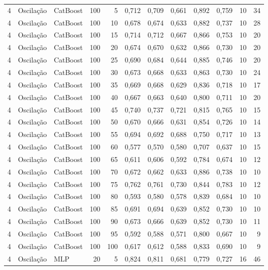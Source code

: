 \begin{longtable}{@{}rllrrrrrrrrr@{}}
4 & Oscilação & CatBoost & 100 & 5 & 0,712 & 0,709 & 0,661 & 0,892 & 0,759 & 10 & 34 \\
4 & Oscilação & CatBoost & 100 & 10 & 0,678 & 0,674 & 0,633 & 0,882 & 0,737 & 10 & 28 \\
4 & Oscilação & CatBoost & 100 & 15 & 0,714 & 0,712 & 0,667 & 0,866 & 0,753 & 10 & 20 \\
4 & Oscilação & CatBoost & 100 & 20 & 0,674 & 0,670 & 0,632 & 0,866 & 0,730 & 10 & 20 \\
4 & Oscilação & CatBoost & 100 & 25 & 0,690 & 0,684 & 0,644 & 0,885 & 0,746 & 10 & 20 \\
4 & Oscilação & CatBoost & 100 & 30 & 0,673 & 0,668 & 0,633 & 0,863 & 0,730 & 10 & 24 \\
4 & Oscilação & CatBoost & 100 & 35 & 0,669 & 0,668 & 0,629 & 0,836 & 0,718 & 10 & 17 \\
4 & Oscilação & CatBoost & 100 & 40 & 0,667 & 0,663 & 0,640 & 0,800 & 0,711 & 10 & 20 \\
4 & Oscilação & CatBoost & 100 & 45 & 0,740 & 0,737 & 0,721 & 0,815 & 0,765 & 10 & 15 \\
4 & Oscilação & CatBoost & 100 & 50 & 0,670 & 0,666 & 0,631 & 0,854 & 0,726 & 10 & 14 \\
4 & Oscilação & CatBoost & 100 & 55 & 0,694 & 0,692 & 0,688 & 0,750 & 0,717 & 10 & 13 \\
4 & Oscilação & CatBoost & 100 & 60 & 0,577 & 0,570 & 0,580 & 0,707 & 0,637 & 10 & 15 \\
4 & Oscilação & CatBoost & 100 & 65 & 0,611 & 0,606 & 0,592 & 0,784 & 0,674 & 10 & 12 \\
4 & Oscilação & CatBoost & 100 & 70 & 0,672 & 0,662 & 0,633 & 0,886 & 0,738 & 10 & 10 \\
4 & Oscilação & CatBoost & 100 & 75 & 0,762 & 0,761 & 0,730 & 0,844 & 0,783 & 10 & 12 \\
4 & Oscilação & CatBoost & 100 & 80 & 0,593 & 0,580 & 0,578 & 0,839 & 0,684 & 10 & 10 \\
4 & Oscilação & CatBoost & 100 & 85 & 0,691 & 0,694 & 0,639 & 0,852 & 0,730 & 10 & 10 \\
4 & Oscilação & CatBoost & 100 & 90 & 0,673 & 0,666 & 0,639 & 0,852 & 0,730 & 10 & 11 \\
4 & Oscilação & CatBoost & 100 & 95 & 0,592 & 0,588 & 0,571 & 0,800 & 0,667 & 10 & 9 \\
4 & Oscilação & CatBoost & 100 & 100 & 0,617 & 0,612 & 0,588 & 0,833 & 0,690 & 10 & 9 \\
4 & Oscilação & MLP & 20 & 5 & 0,824 & 0,811 & 0,681 & 0,779 & 0,727 & 16 & 46 \\

\end{longtable}
